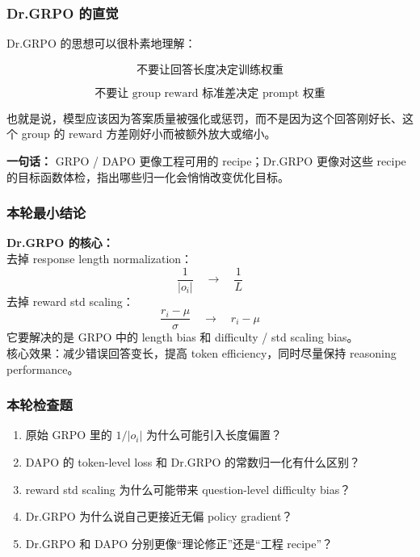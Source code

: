 \subsubsection{Dr.GRPO 的直觉}

Dr.GRPO 的思想可以很朴素地理解：

\[
\text{不要让回答长度决定训练权重}
\]

\[
\text{不要让 group reward 标准差决定 prompt 权重}
\]

也就是说，模型应该因为答案质量被强化或惩罚，而不是因为这个回答刚好长、这个 group 的 reward 方差刚好小而被额外放大或缩小。

\begin{summarybox}
\textbf{一句话：} GRPO / DAPO 更像工程可用的 recipe；Dr.GRPO 更像对这些 recipe 的目标函数体检，指出哪些归一化会悄悄改变优化目标。
\end{summarybox}

\subsubsection{本轮最小结论}

\begin{summarybox}
\textbf{Dr.GRPO 的核心：}\\
去掉 response length normalization：
\[
\frac{1}{|o_i|}
\quad \to \quad
\frac{1}{L}
\]
去掉 reward std scaling：
\[
\frac{r_i-\mu}{\sigma}
\quad \to \quad
r_i-\mu
\]
它要解决的是 GRPO 中的 length bias 和 difficulty / std scaling bias。\\
核心效果：减少错误回答变长，提高 token efficiency，同时尽量保持 reasoning performance。
\end{summarybox}

\subsubsection{本轮检查题}

\begin{enumerate}[leftmargin=1.5em]
  \item 原始 GRPO 里的 $1/|o_i|$ 为什么可能引入长度偏置？
  \item DAPO 的 token-level loss 和 Dr.GRPO 的常数归一化有什么区别？
  \item reward std scaling 为什么可能带来 question-level difficulty bias？
  \item Dr.GRPO 为什么说自己更接近无偏 policy gradient？
  \item Dr.GRPO 和 DAPO 分别更像“理论修正”还是“工程 recipe”？
\end{enumerate}
